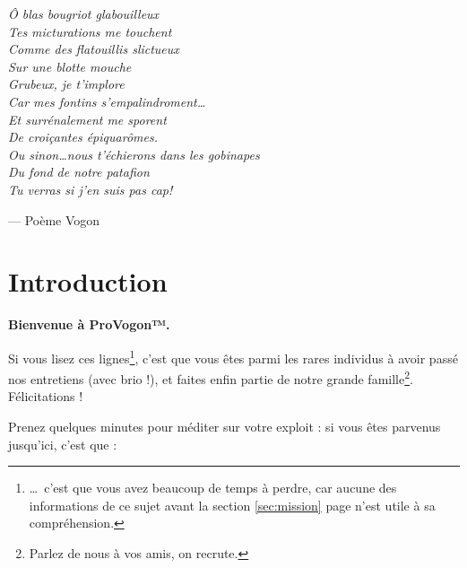 \newcommand{\provogon}{ProVogon™}

\vspace{-1cm}

\noindent\emph{Ô blas bougriot glabouilleux\\
Tes micturations me touchent\\
Comme des flatouillis slictueux\\
Sur une blotte mouche\\
Grubeux, je t'implore\\
Car mes fontins s'empalindroment\ldots\\
Et surrénalement me sporent\\
De croiçantes épiquarômes.\\
Ou sinon\ldots nous t'échierons dans les gobinapes\\
Du fond de notre patafion\\
Tu verras si j'en suis pas cap!
}

\vspace{1cm}

\hspace{5cm} --- Poème Vogon

\newpage

\section{Introduction}

\textbf{Bienvenue à \provogon{}.}

Si vous lisez ces lignes\footnote{\ldots~c'est que vous avez
beaucoup de temps à perdre, car aucune des informations de ce sujet avant la
section \ref{sec:mission} page \pageref{sec:mission} n'est utile à sa
compréhension.},
c'est que vous êtes parmi les rares individus à avoir passé nos entretiens
(avec brio !), et faites enfin partie de notre grande famille\footnote{Parlez
de nous à vos amis, on recrute.}. Félicitations !

Prenez quelques minutes pour méditer sur votre exploit : si vous êtes parvenus
jusqu'ici, c'est que :

